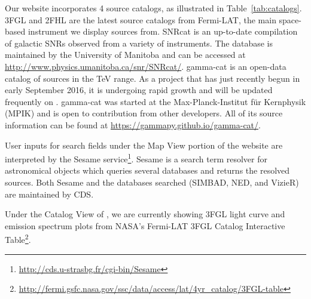 Our website incorporates 4 source catalogs, as illustrated in Table~\ref{tab:catalogs}. 3FGL \cite{3fgl} and 2FHL \cite{2fhl} are the latest source catalogs from Fermi-LAT, the main space-based instrument we display sources from. SNRcat \cite{snrcat} is an up-to-date compilation of galactic SNRs observed from a variety of instruments. The database is maintained by the University of Manitoba and can be accessed at \url{http://www.physics.umanitoba.ca/snr/SNRcat/}. gamma-cat is an open-data catalog of sources in the TeV range. As a project that has just recently begun in early September 2016, it is undergoing rapid growth and will be updated frequently on \gammasky. gamma-cat was started at the Max-Planck-Institut f\"{u}r Kernphysik (MPIK) and is open to contribution from other developers. All of its source information can be found at \url{https://gammapy.github.io/gamma-cat/}.

User inputs for search fields under the Map View portion of the website are interpreted by the Sesame service\footnote[6]{\url{http://cds.u-strasbg.fr/cgi-bin/Sesame}}. Sesame is a search term resolver for astronomical objects which queries several databases and returns the resolved sources. Both Sesame and the databases searched (SIMBAD, NED, and VizieR) are maintained by CDS.

Under the Catalog View of \gammasky, we are currently showing 3FGL light curve and emission spectrum plots from NASA's Fermi-LAT 3FGL Catalog Interactive Table\footnote[7]{\url{http://fermi.gsfc.nasa.gov/ssc/data/access/lat/4yr_catalog/3FGL-table}}.
